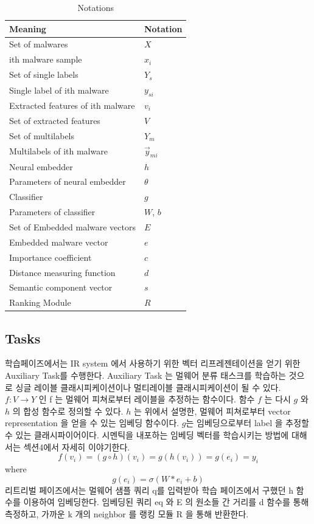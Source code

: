 \begin{table}[!htb] %
\caption{Notations}
\label{tab:notation}
\begin{minipage}{\columnwidth}
\begin{center}
\begin{tabular}{ll}
\toprule
Meaning & Notation\\
\midrule
  Set of malwares     & $X$ \\
  ith malware sample  & $x_i$ \\
  Set of single labels & $Y_s$ \\
  Single label of ith malware    & $y_{si}$ \\
  Extracted features of ith malware & $v_i$ \\
  Set of extracted features   & $V$ \\
  Set of multilabels   & $Y_m$ \\
  Multilabels of ith malware & $\vec{y}_{mi}$\\
  Neural embedder & $h$ \\
  Parameters of neural embedder & $\theta$ \\
  Classifier & $g$ \\   
  Parameters of classifier & $W$, $b$ \\  
  Set of Embedded malware vectors & $E$ \\
  Embedded malware vector & $e$ \\
  Importance coefficient & $c$ \\
  Distance measuring function & $d$ \\
  Semantic component vector & $s$ \\
  Ranking Module & $R$\\
\bottomrule
\end{tabular}
\end{center}
\bigskip\centering
\end{minipage}
\end{table}


\subsection{Tasks}
학습페이즈에서는 IR system 에서 사용하기 위한 벡터 리프레젠테이션을 얻기 위한 Auxiliary Task를 수행한다. Auxiliary Task 는 멀웨어 분류 태스크를 학습하는 것으로 싱글 레이블 클래시피케이션이나 멀티레이블 클래시피케이션이 될 수 있다. $f: V \rightarrow Y $ 인 f 는 멀웨어 피쳐로부터 레이블을 추정하는 함수이다. 함수 $f$ 는 다시 $g$ 와 $h$ 의 합성 함수로 정의할 수 있다. $h$ 는 위에서 설명한, 멀웨어 피쳐로부터 vector representation 을 얻을 수 있는 임베딩 함수이다. $g$는 임베딩으로부터 label 을 추정할 수 있는 클래시파이어이다. 시멘틱을 내포하는 임베딩 벡터를 학습시키는 방법에 대해서는 섹션4에서 자세히 이야기한다. 
\[
f(v_i) = (g \circ h)(v_i) = g(h(v_i)) = g(e_i) = y_i 
\]
where
\[
g(e_i) = \sigma (W*e_i + b) 
\]
리트리벌 페이즈에서는 멀웨어 샘플 쿼리 q를 입력받아 학습 페이즈에서 구했던 h 함수를 이용하여 임베딩한다. 임베딩된 쿼리 eq 와 E 의 원소들 간 거리를 d 함수를 통해 측정하고, 가까운 k 개의 neighbor 를 랭킹 모듈 R 을 통해 반환한다. 

